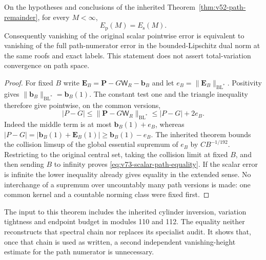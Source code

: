 \begin{theorem}
\label{thm:v73-scalar-path-equality}
On the hypotheses and conclusions of the inherited
Theorem~\ref{thm:v52-path-remainder}, for every $M<\infty$,
\begin{equation}\label{eq:v73-scalar-path-equality}
                    E_{\mathrm p}(M)=E_{\mathrm s}(M).
\end{equation}
Consequently vanishing of the original scalar pointwise error is
equivalent to vanishing of the full path-numerator error in the
bounded-Lipschitz dual norm at the same roofs and exact labels.
This statement does not assert total-variation convergence on path
space.
\end{theorem}
\begin{proof}
For fixed $B$ write
$\mathbf E_B=\mathbf P-G\mathsf W_R-\mathbf b_B$ and let
$e_B=\|\mathbf E_B\|_{\mathrm{BL}^*}$. Positivity gives
$\|\mathbf b_B\|_{\mathrm{BL}^*}=\mathbf b_B(1)$. The constant
test one and the triangle inequality therefore give pointwise,
on the common versions,
\begin{equation}\label{eq:v73-pointwise-norm-comparison}
 |P-G|\le\|\mathbf P-G\mathsf W_R\|_{\mathrm{BL}^*}
                                      \le |P-G|+2e_B.
\end{equation}
Indeed the middle term is at most $\mathbf b_B(1)+e_B$, whereas
$|P-G|=|\mathbf b_B(1)+\mathbf E_B(1)|
\ge\mathbf b_B(1)-e_B$. The inherited theorem bounds the collision
limsup of the global essential supremum of $e_B$ by
$CB^{-1/192}$. Restricting to the original central set, taking the
collision limit at fixed $B$, and then sending $B$ to infinity
proves \eqref{eq:v73-scalar-path-equality}. If the scalar error is
infinite the lower inequality already gives equality in the extended
sense. No interchange of a supremum over uncountably many path
versions is made: one common kernel and a countable norming class
were fixed first.
\end{proof}

The input to this theorem includes the inherited cylinder inversion,
variation tightness and endpoint budget in modules 110 and 112.
The equality neither reconstructs that spectral chain nor replaces
its specialist audit. It shows that, once that chain is used as
written, a second independent vanishing-height estimate for the
path numerator is unnecessary.

